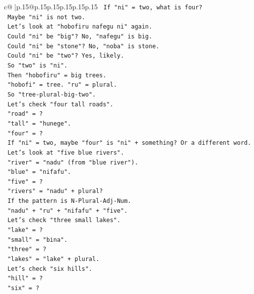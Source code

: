 \documentclass{article}
\begin{document}
{\begin{supertabular}{c@{$\;$}|p{.15\linewidth}@{}p{.15\linewidth}p{.15\linewidth}p{.15\linewidth}p{.15\linewidth}p{.15\linewidth}}
{{{\texttt{        If "ni" = two, what is four?} \\
\texttt{        Maybe "ni" is not two.} \\
\texttt{        Let's look at "hobofiru nafegu ni" again.} \\
\texttt{        Could "ni" be "big"? No, "nafegu" is big.} \\
\texttt{        Could "ni" be "stone"? No, "noba" is stone.} \\
\texttt{        Could "ni" be "two"? Yes, likely.} \\
\texttt{        So "two" is "ni".} \\
\texttt{        Then "hobofiru" = big trees.} \\
\texttt{        "hobofi" = tree. "ru" = plural.} \\
\texttt{        So "tree{-}plural{-}big{-}two".} \\
\texttt{        Let's check "four tall roads".} \\
\texttt{        "road" = ?} \\
\texttt{        "tall" = "hunege".} \\
\texttt{        "four" = ?} \\
\texttt{        If "ni" = two, maybe "four" is "ni" + something? Or a different word.} \\
\texttt{        Let's look at "five blue rivers".} \\
\texttt{        "river" = "nadu" (from "blue river").} \\
\texttt{        "blue" = "nifafu".} \\
\texttt{        "five" = ?} \\
\texttt{        "rivers" = "nadu" + plural?} \\
\texttt{        If the pattern is N{-}Plural{-}Adj{-}Num.} \\
\texttt{        "nadu" + "ru" + "nifafu" + "five".} \\
\texttt{        Let's check "three small lakes".} \\
\texttt{        "lake" = ?} \\
\texttt{        "small" = "bina".} \\
\texttt{        "three" = ?} \\
\texttt{        "lakes" = "lake" + plural.} \\
\texttt{        Let's check "six hills".} \\
\texttt{        "hill" = ?} \\
\texttt{        "six" = ?} \\
}}}
\end{supertabular}}
\end{document}
